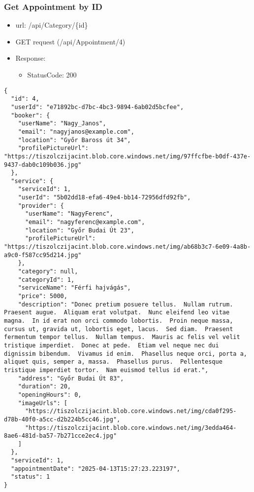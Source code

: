 \documentclass[11pt]{article}
\begin{document}
\subsubsection{Get Appointment by ID}
\label{sec:orgec82ec6}
\begin{itemize}
\item url: /api/Category/\{id\}
\item GET request (/api/Appointment/4)
\item Response:
\begin{itemize}
\item StatusCode: 200
\end{itemize}
\end{itemize}
\begin{verbatim}
{
  "id": 4,
  "userId": "e71892bc-d7bc-4bc3-9894-6ab02d5bcfee",
  "booker": {
    "userName": "Nagy_Janos",
    "email": "nagyjanos@example.com",
    "location": "Győr Baross út 34",
    "profilePictureUrl": "https://tiszolczijacint.blob.core.windows.net/img/97ffcfbe-b0df-437e-9437-dab0c109b036.jpg"
  },
  "service": {
    "serviceId": 1,
    "userId": "5b02dd18-efa6-49e4-bb14-72956dfd92fb",
    "provider": {
      "userName": "NagyFerenc",
      "email": "nagyferenc@example.com",
      "location": "Győr Budai Út 23",
      "profilePictureUrl": "https://tiszolczijacint.blob.core.windows.net/img/ab68b3c7-6e09-4a8b-a9c0-f587cc95d214.jpg"
    },
    "category": null,
    "categoryId": 1,
    "serviceName": "Férfi hajvágás",
    "price": 5000,
    "description": "Donec pretium posuere tellus.  Nullam rutrum.  Praesent augue.  Aliquam erat volutpat.  Nunc eleifend leo vitae magna.  In id erat non orci commodo lobortis.  Proin neque massa, cursus ut, gravida ut, lobortis eget, lacus.  Sed diam.  Praesent fermentum tempor tellus.  Nullam tempus.  Mauris ac felis vel velit tristique imperdiet.  Donec at pede.  Etiam vel neque nec dui dignissim bibendum.  Vivamus id enim.  Phasellus neque orci, porta a, aliquet quis, semper a, massa.  Phasellus purus.  Pellentesque tristique imperdiet tortor.  Nam euismod tellus id erat.",
    "address": "Győr Budai Út 83",
    "duration": 20,
    "openingHours": 0,
    "imageUrls": [
      "https://tiszolczijacint.blob.core.windows.net/img/cda0f295-d78b-40f0-a5cc-d2b224b5cc46.jpg",
      "https://tiszolczijacint.blob.core.windows.net/img/3edda464-8ae6-481d-ba57-7b271cce2ec4.jpg"
    ]
  },
  "serviceId": 1,
  "appointmentDate": "2025-04-13T15:27:23.223197",
  "status": 1
}
\end{verbatim}
\end{document}
